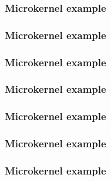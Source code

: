 
\begin{frame}
  \frametitle{Microkernel example}

  \begin{center}
  \end{center}
\end{frame}

\begin{frame}
  \frametitle{Microkernel example}

  \begin{center}
  \end{center}
\end{frame}

\begin{frame}
  \frametitle{Microkernel example}

  \begin{center}
  \end{center}
\end{frame}

\begin{frame}
  \frametitle{Microkernel example}

  \begin{center}
  \end{center}
\end{frame}

\begin{frame}
  \frametitle{Microkernel example}

  \begin{center}
  \end{center}
\end{frame}

\begin{frame}
  \frametitle{Microkernel example}

  \begin{center}
  \end{center}
\end{frame}

\begin{frame}
  \frametitle{Microkernel example}

  \begin{center}
  \end{center}
\end{frame}

